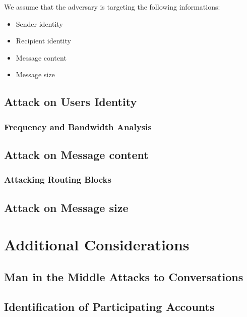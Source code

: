 We assume that the adversary is targeting the following informations:
\begin{itemize}
	\item Sender identity
	\item Recipient identity
	\item Message content
	\item Message size
\end{itemize}

\section{Attack on Users Identity}

\subsection{Frequency and Bandwidth Analysis}

\section{Attack on Message content}

\subsection{Attacking Routing Blocks}

\section{Attack on Message size}


\chapter{Additional Considerations}
\section{Man in the Middle Attacks to Conversations}


\section{Identification of Participating Accounts}

